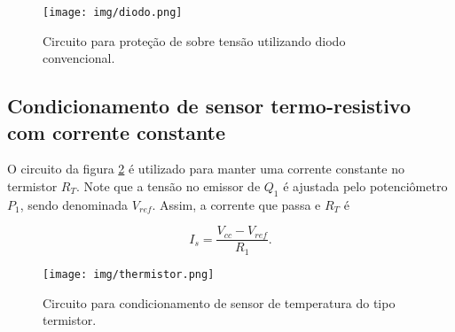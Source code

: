 \begin{figure}[H]
	\centering
	\texttt{[image: img/diodo.png]}
	\caption{Circuito para proteção de sobre tensão utilizando diodo convencional.}
	\label{f_diodo}
\end{figure}

\subsection{Condicionamento de sensor termo-resistivo com corrente constante}
O circuito da figura \ref{f_thermistor} é utilizado para manter uma corrente constante no termistor $R_T$. Note que a tensão no emissor de $Q_1$ é ajustada pelo potenciômetro $P_1$, sendo denominada $V_{ref}$. Assim, a corrente que passa e $R_T$ é

\begin{equation}
I_s = \frac{V_{cc}-V_{ref}}{R_1}.
\label{e_is}
\end{equation}

\begin{figure}[H]
	\centering
	\texttt{[image: img/thermistor.png]}
	\caption{Circuito para condicionamento de sensor de temperatura do tipo termistor.}
	\label{f_thermistor}
\end{figure}